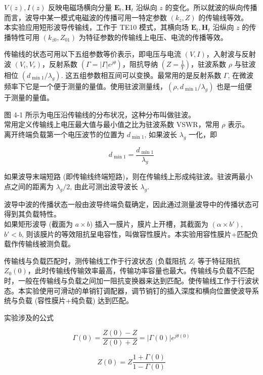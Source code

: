 \documentclass[12pt,hyperref,a4paper,UTF8]{ctexart}
\begin{document}
$V(z), I(z)$ 反映电磁场横向分量 $\mathbf{E}_t, \mathbf{H}_t$ 沿纵向 $z$ 的变化。所以就波的纵向传播而言，波导中某一模式电磁波的传播可用一特定参数 $(k_z, Z)$ 的传输线等效。\\
本实验应用短形波导传输线，工作于 TE10 模式，其横向场 $\mathbf{E}_t, \mathbf{H}_t$ 沿纵向 $z$ 的传播特性可用 $(k_{z0}, Z_{01})$ 为特征参数的传输线上电压、电流的传播等效。

传输线的状态可用以下五组参数等价表示，即电压与电流 $(V, I)$，入射波与反射波 $(V_i, V_r)$，反射系数 $(\Gamma = | \Gamma | e^{j\theta})$，阻抗导纳 $(Z = \frac{1}{Y})$，驻波系数 $\rho$ 与驻波相位 $(d_{\min 1}/\lambda_g)$. 这五组参数相互间可以变换。最常用的是反射系数 $\Gamma$, 在微波频率下它是一个便于测量的量值。使用驻波测量线，$(\rho, d_{\min 1}/\lambda_g)$ 也是一组便于测量的量值。

图 4-1 所示为电压沿传输线的分布状况，这种分布叫做驻波。\\
常用定义传输线上电压最大值与最小值之比为驻波系数 VSWR，常用 $\rho$ 表示。\\
离开终端负载第一个电压波节的位置为 $d_{\min 1}$, 如果波长 $\lambda_g$ 一化，即

\begin{equation}
d_{\min 1} = \frac{d_{\min 1}}{\lambda_g}
\end{equation}

如果波导末端短路 (即传输线终端短路)，则在传输线上形成纯驻波。驻波两最小点之间的距离为 $\lambda_g/2$, 由此可测出波导波长 $\lambda_g$.

波导中波的传播状态一般由波导终端负载确定，因此通过测量波导中的传播状态可得到其负载特性。\\
如果矩形波导 (截面为 $a \times b$) 插入一膜片，膜片上开槽，其截面为 $(\alpha \times b')$, $b' < b$, 则该膜片的等效阻抗呈电容性，叫做容性膜片。本实验用容性膜片+匹配负载作传输线被测负载。

传输线与负载匹配时，测传输线工作于行波状态 (负载阻抗 $Z_l$ 等于特征阻抗 $Z_0(0)$，此时传输线传输效率最高，传输功率容量也最大。传输线与负载不匹配时，一般在传输线与负载之间加一阻抗变换器来达到匹配。使传输线工作于行波状态。本实验使用可滑动的单销钉调配器，调节销钉的插入深度和横向位置使波导系统与负载 (容性膜片+纯负载) 达到匹配。

实验涉及的公式

\begin{equation}
\Gamma(0) = \frac{Z(0) - Z}{Z(0) + Z} = |\Gamma(0)| e^{j\theta(0)} \tag{式 4-3}
\end{equation}

\begin{equation}
Z(0) = Z \frac{1 + \Gamma (0)}{1 - \Gamma (0)} \tag{式 4-4}
\end{equation}
\end{document}

